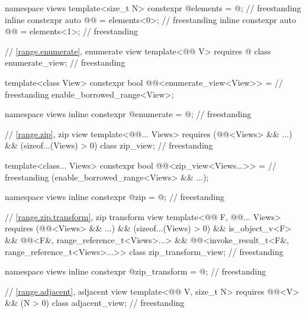 \begin{codeblock}
{  namespace views {
    template<size_t N>
      constexpr @\unspecnc@ elements = @\unspecnc@;                                 // freestanding
    inline constexpr auto @@ = elements<0>;                                       // freestanding
    inline constexpr auto @@ = elements<1>;                                     // freestanding
  }

  // \ref{range.enumerate}, enumerate view
  template<@@ V>
    requires @\seebelow@
  class enumerate_view;                                                             // freestanding

  template<class View>
    constexpr bool @@<enumerate_view<View>> =                    // freestanding
      enable_borrowed_range<View>;

  namespace views { inline constexpr @\unspecnc@ enumerate = @\unspecnc@; }         // freestanding

  // \ref{range.zip}, zip view
  template<@@... Views>
    requires (@@<Views> && ...) && (sizeof...(Views) > 0)
  class zip_view;                                                                   // freestanding

  template<class... Views>
    constexpr bool @@<zip_view<Views...>> =                      // freestanding
      (enable_borrowed_range<Views> && ...);

  namespace views { inline constexpr @\unspecnc@ zip = @\unspecnc@; }               // freestanding

  // \ref{range.zip.transform}, zip transform view
  template<@@ F, @@... Views>
    requires (@@<Views> && ...) && (sizeof...(Views) > 0) && is_object_v<F> &&
             @@<F&, range_reference_t<Views>...> &&
             @@<invoke_result_t<F&, range_reference_t<Views>...>>
  class zip_transform_view;                                                         // freestanding

  namespace views { inline constexpr @\unspecnc@ zip_transform = @\unspecnc@; }     // freestanding

  // \ref{range.adjacent}, adjacent view
  template<@@ V, size_t N>
    requires @@<V> && (N > 0)
  class adjacent_view;                                                              // freestanding

}
\end{codeblock}
